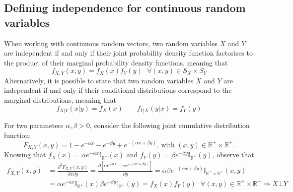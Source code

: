 \documentclass{report}
\begin{document}
\subsection{Defining independence for continuous random variables}
When working with continuous random vectors, two random variables $\displaystyle X$ and $\displaystyle Y$ are independent if and only if their joint probability density function factorises to the product of their marginal probability density functions, meaning that
\[f_{X, Y}(x, y) = f_X(x)f_Y(y) \text{ } \forall (x, y) \in S_X \times S_Y\]
Alternatively, it is possible to state that two random variables $\displaystyle X$ and $\displaystyle Y$ are independent if and only if their conditional distributions correspond to the marginal distributions, meaning that
\[f_{X|Y}(x|y) = f_X(x) \quad\quad f_{Y|X}(y|x) = f_Y(y)\]
\begin{examplebox}
    For two parameters $\alpha, \beta > 0$, consider the following joint cumulative distribution function:
    \[F_{X, Y}(x, y) = 1 - e^{-\alpha x} - e^{-\beta y} + e^{-(\alpha x + \beta y)} \text{, with $(x, y) \in \mathbb{R}^+ \times \mathbb{R}^+$.}\]
    Knowing that $\displaystyle f_X(x) = \alpha e^{-\alpha x}\mathbb{I}_{\mathbb{R}^+}(x)$ and $\displaystyle f_Y(y) = \beta e^{-\beta y}\mathbb{I}_{\mathbb{R}^+}(y)$, observe that
    \begin{align*}
        f_{X, Y}(x, y)
            &= \frac{\partial^2F_{X, Y}(x, y)}{\partial x \partial y} = \frac{\partial[\alpha e^{-\alpha x} - \alpha e^{-(\alpha x + \beta y)}]}{\partial y} = \alpha\beta e^{-(\alpha x + \beta y)}\mathbb{I}_{\mathbb{R}^+ \times \mathbb{R}^+}(x, y) \\
            &= \alpha e^{-\alpha x}\mathbb{I}_{\mathbb{R}^+}(x)\beta e^{-\beta y}\mathbb{I}_{\mathbb{R}^+}(y) = f_X(x)f_Y(y) \text{ } \forall (x, y) \in \mathbb{R}^+ \times \mathbb{R}^+ \Rightarrow X \bot Y
    \end{align*}
\end{examplebox}
\end{document}
